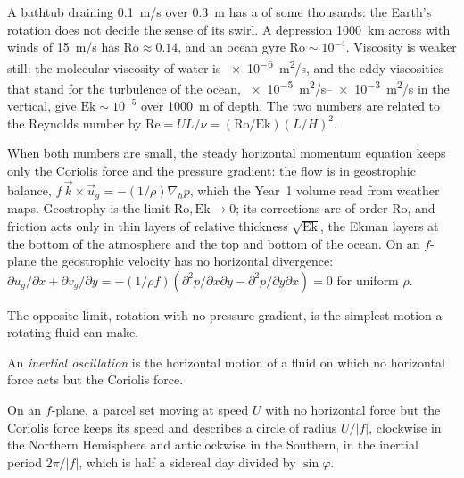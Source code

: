 A bathtub draining \qty{0.1}{m/s} over \qty{0.3}{m} has a  of
some thousands: the Earth's rotation does not decide the sense of its
swirl. A depression \qty{1000}{km} across with winds of \qty{15}{m/s} has
$\mathrm{Ro} \approx 0.14$, and an ocean gyre $\mathrm{Ro} \sim 10^{-4}$.
Viscosity is weaker still: the molecular viscosity of water is
\qty{e-6}{m^2/s}, and the eddy viscosities that stand for the turbulence
of the ocean, \qtyrange{e-5}{e-3}{m^2/s} in the vertical, give
$\mathrm{Ek} \sim 10^{-5}$ over \qty{1000}{m} of depth. The two numbers are
related to the Reynolds number by $\mathrm{Re} = UL/\nu =
(\mathrm{Ro}/\mathrm{Ek})(L/H)^2$.

When both numbers are small, the steady horizontal momentum equation keeps
only the Coriolis force and the pressure gradient: the flow is in
geostrophic balance, $f\,\vec k\times\vec u_g = -(1/\rho)\nabla_h p$, which
the Year~1 volume read from weather maps. Geostrophy is the limit
$\mathrm{Ro}, \mathrm{Ek}\to 0$; its corrections are of order
$\mathrm{Ro}$, and friction acts only in thin layers of relative thickness
$\sqrt{\mathrm{Ek}}$, the Ekman layers at the bottom of the atmosphere and
the top and bottom of the ocean. On an $f$-plane the geostrophic velocity
has no horizontal divergence: $\partial u_g/\partial x + \partial
v_g/\partial y = -(1/\rho f)(\partial^2 p/\partial x\partial y -
\partial^2 p/\partial y\partial x) = 0$ for uniform $\rho$.

The opposite limit, rotation with no pressure gradient, is the simplest
motion a rotating fluid can make.

\begin{definition}\label{def:b3:gfd-foundations:inertial}
An \emph{inertial oscillation} is the
horizontal motion of a fluid on which no horizontal force acts but the
Coriolis force.
\end{definition}

\begin{theorem}\label{thm:b3:gfd-foundations:inertial}
On an $f$-plane, a parcel set moving at speed $U$ with no horizontal force
but the Coriolis force keeps its speed and describes a circle of radius
$U/|f|$, clockwise in the Northern Hemisphere and anticlockwise in the
Southern, in the inertial period $2\pi/|f|$, which is half a sidereal day
divided by $\sin\varphi$.
\end{theorem}

